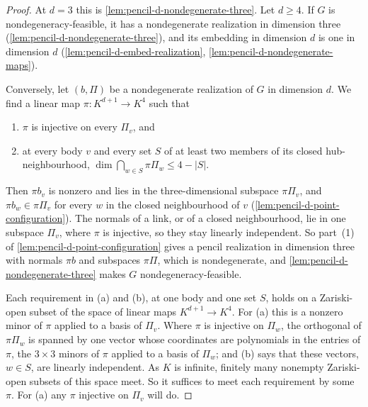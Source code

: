 \begin{proof}
  \leanok
  At $d = 3$ this is \cref{lem:pencil-d-nondegenerate-three}. Let
  $d \ge 4$. If $G$ is nondegeneracy-feasible, it has a nondegenerate
  realization in dimension three (\cref{lem:pencil-d-nondegenerate-three}),
  and its embedding in dimension $d$ is one in dimension $d$
  (\cref{lem:pencil-d-embed-realization},
  \cref{lem:pencil-d-nondegenerate-maps}).

  Conversely, let $(b, \Pi)$ be a nondegenerate realization of $G$ in
  dimension $d$. We find a linear map $\pi \colon K^{d+1} \to K^4$ such
  that
  \begin{enumerate}
    \item[(a)] $\pi$ is injective on every $\Pi_v$, and
    \item[(b)] at every body $v$ and every set $S$ of at least two members
      of its closed hub-neighbourhood,
      $\dim \bigcap_{w \in S} \pi\Pi_w \le 4 - |S|$.
  \end{enumerate}
  Then $\pi b_v$ is nonzero and lies in the three-dimensional subspace
  $\pi\Pi_v$, and $\pi b_w \in \pi \Pi_v$ for every $w$ in the closed
  neighbourhood of $v$ (\cref{lem:pencil-d-point-configuration}). The
  normals of a link, or of a closed neighbourhood, lie in one subspace
  $\Pi_v$, where $\pi$ is injective, so they stay linearly independent.
  So part~(1) of \cref{lem:pencil-d-point-configuration} gives a pencil
  realization in dimension three with normals $\pi b$ and subspaces
  $\pi \Pi$, which is nondegenerate, and
  \cref{lem:pencil-d-nondegenerate-three} makes $G$
  nondegeneracy-feasible.

  Each requirement in (a) and (b), at one body and one set $S$, holds on a
  Zariski-open subset of the space of linear maps $K^{d+1} \to K^4$. For
  (a) this is a nonzero minor of $\pi$ applied to a basis of $\Pi_v$.
  Where $\pi$ is injective on $\Pi_w$, the orthogonal of $\pi \Pi_w$ is
  spanned by one vector whose coordinates are polynomials in the entries
  of $\pi$, the $3 \times 3$ minors of $\pi$ applied to a basis of
  $\Pi_w$; and (b) says that these vectors, $w \in S$, are linearly
  independent. As $K$ is infinite, finitely many nonempty Zariski-open
  subsets of this space meet. So it suffices to meet each requirement by
  some $\pi$. For (a) any $\pi$ injective on $\Pi_v$ will do.


\end{proof}
